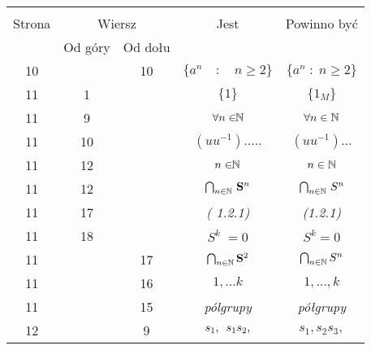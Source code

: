 \documentclass[a4paper,11pt]{article}
\begin{document}
\begin{center}
  \begin{tabular}{|c|c|c|c|c|}
    \hline
    & \multicolumn{2}{c|}{} & & \\
    Strona & \multicolumn{2}{c|}{Wiersz} & Jest
                              & Powinno być \\ \cline{2-3}
    & Od góry & Od dołu & & \\
    \hline
    10 & & 10 & $\{ a^{ n } \quad : \quad n \geq 2 \}$ & $\{ a^{ n } \; : \; n \geq 2 \}$ \\
    11 &  1 & & $\{ 1 \}$ & $\{ 1_{ M } \}$ \\
    11 &  9 & & $\forall n \in \!\! \mathbb{N}$ & $\forall n \in \mathbb{N}$ \\
    11 & 10 & & $( u u^{ -1 } ).....$ & $( u u^{ - 1 } ) \ldots$ \\
    11 & 12 & & $n \in \!\! \mathbb{N}$ & $n \in \mathbb{N}$ \\
    11 & 12 & & $\bigcap_{ n \in \mathbb{N} } \, \mathbf{S}^{ n }$
           & $\bigcap_{ n \in \mathbb{N} } \, S^{ n }$ \\
    11 & 17 & & \textit{( 1.2.1)} & \textit{(1.2.1)} \\
    11 & 18 & & $S^{ k } \; = 0$ & $S^{ k } = 0$ \\
    11 & & 17 & $\bigcap_{ n \in \mathbb{N} } \mathbf{S}^{ 2 }$
           & $\bigcap_{ n \in \mathbb{N} } S^{ n }$ \\
    11 & & 16 & $1, ...k$ & $1, \ldots, k$ \\
    11 & & 15 & \textit{pólgrupy} & \textit{półgrupy} \\
    12 & &  9 & $s_{ 1 }, \hspace{0.5em} s_{ 1 } s_{ 2 },$
           & $s_{ 1 }, s_{ 2 } s_{ 3 },$ \\

\end{tabular}
\end{center}
\end{document}
